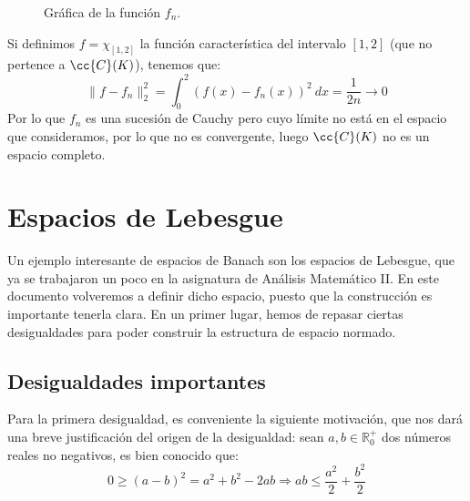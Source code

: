 \begin{itemize}
\begin{figure}[H]
            \caption{Gráfica de la función $f_n$.}
            \label{fig:no_hilbert}
        \end{figure}
        Si definimos $f=  \chi_{[1,2]}$ la función característica del intervalo $[1,2]$ (que no pertence a $\cc{C}(K)$), tenemos que:
        \begin{equation*}
            \|f-f_n\|_2^2 = \int_{0}^{2} {(f(x)- f_n(x))}^{2}~dx  = \dfrac{1}{2n} \to 0
        \end{equation*}
        Por lo que $f_n$ es una sucesión de Cauchy pero cuyo límite no está en el espacio que consideramos, por lo que no es convergente, luego $\cc{C}(K)$ no es un espacio completo. %
\end{itemize}

\section{Espacios de Lebesgue}
Un ejemplo interesante de espacios de Banach son los espacios de Lebesgue, que ya se trabajaron un poco en la asignatura de Análisis Matemático II. En este documento volveremos a definir dicho espacio, puesto que la construcción es importante tenerla clara. En un primer lugar, hemos de repasar ciertas desigualdades para poder construir la estructura de espacio normado.

\subsection{Desigualdades importantes}
Para la primera desigualdad, es conveniente la siguiente motivación, que nos dará una breve justificación del origen de la desigualdad: sean $a,b\in \mathbb{R}^+_0$ dos números reales no negativos, es bien conocido que:
\begin{equation*}
    0 \geq {(a-b)}^{2} = a^2 + b^2 - 2ab \Longrightarrow ab \leq \dfrac{a^2}{2} + \dfrac{b^2}{2}
\end{equation*}

